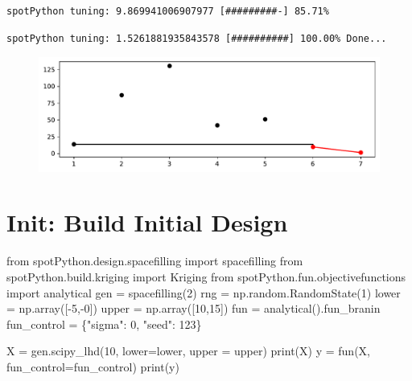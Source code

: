 \documentclass[
  letterpaper,
  DIV=11,
  numbers=noendperiod]{scrreprt}
\newenvironment{Shaded}{\begin{snugshade}}{\end{snugshade}}
\newcommand{\BuiltInTok}[1]{\textcolor[rgb]{0.00,0.23,0.31}{#1}}
\newcommand{\DecValTok}[1]{\textcolor[rgb]{0.68,0.00,0.00}{#1}}
\newcommand{\ImportTok}[1]{\textcolor[rgb]{0.00,0.46,0.62}{#1}}
\newcommand{\NormalTok}[1]{\textcolor[rgb]{0.00,0.23,0.31}{#1}}
\newcommand{\OperatorTok}[1]{\textcolor[rgb]{0.37,0.37,0.37}{#1}}
\newcommand{\StringTok}[1]{\textcolor[rgb]{0.13,0.47,0.30}{#1}}
\begin{document}
\begin{verbatim}
spotPython tuning: 9.869941006907977 [#########-] 85.71% 
\end{verbatim}

\begin{verbatim}
spotPython tuning: 1.5261881935843578 [##########] 100.00% Done...
\end{verbatim}

\begin{figure}[H]

{\centering \includegraphics{a_04_spot_doc_files/figure-pdf/cell-10-output-3.pdf}

}

\end{figure}

\hypertarget{init-build-initial-design-1}{%
\section{Init: Build Initial Design}\label{init-build-initial-design-1}}

\begin{Shaded}
\begin{Highlighting}[]
\ImportTok{from}\NormalTok{ spotPython.design.spacefilling }\ImportTok{import}\NormalTok{ spacefilling}
\ImportTok{from}\NormalTok{ spotPython.build.kriging }\ImportTok{import}\NormalTok{ Kriging}
\ImportTok{from}\NormalTok{ spotPython.fun.objectivefunctions }\ImportTok{import}\NormalTok{ analytical}
\NormalTok{gen }\OperatorTok{=}\NormalTok{ spacefilling(}\DecValTok{2}\NormalTok{)}
\NormalTok{rng }\OperatorTok{=}\NormalTok{ np.random.RandomState(}\DecValTok{1}\NormalTok{)}
\NormalTok{lower }\OperatorTok{=}\NormalTok{ np.array([}\OperatorTok{{-}}\DecValTok{5}\NormalTok{,}\OperatorTok{{-}}\DecValTok{0}\NormalTok{])}
\NormalTok{upper }\OperatorTok{=}\NormalTok{ np.array([}\DecValTok{10}\NormalTok{,}\DecValTok{15}\NormalTok{])}
\NormalTok{fun }\OperatorTok{=}\NormalTok{ analytical().fun\_branin}
\NormalTok{fun\_control }\OperatorTok{=}\NormalTok{ \{}\StringTok{"sigma"}\NormalTok{: }\DecValTok{0}\NormalTok{,}
               \StringTok{"seed"}\NormalTok{: }\DecValTok{123}\NormalTok{\}}

\NormalTok{X }\OperatorTok{=}\NormalTok{ gen.scipy\_lhd(}\DecValTok{10}\NormalTok{, lower}\OperatorTok{=}\NormalTok{lower, upper }\OperatorTok{=}\NormalTok{ upper)}
\BuiltInTok{print}\NormalTok{(X)}
\NormalTok{y }\OperatorTok{=}\NormalTok{ fun(X, fun\_control}\OperatorTok{=}\NormalTok{fun\_control)}
\BuiltInTok{print}\NormalTok{(y)}
\end{Highlighting}
\end{Shaded}
\end{document}
